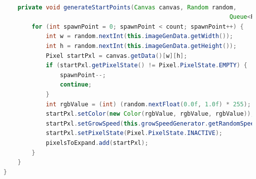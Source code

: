 \documentclass[a4paper,10pt,ngerman]{scrartcl}
\begin{document}
\begin{lstlisting}[language=Java]
    
    private void generateStartPoints(Canvas canvas, Random random, 
    															Queue<Pixel> pixelsToExpand, int count) {
        for (int spawnPoint = 0; spawnPoint < count; spawnPoint++) {
            int w = random.nextInt(this.imageGenData.getWidth());
            int h = random.nextInt(this.imageGenData.getHeight());
            Pixel startPxl = canvas.getData()[w][h];
            if (startPxl.getPixelState() != Pixel.PixelState.EMPTY) {
                spawnPoint--;
                continue;
            }
            int rgbValue = (int) (random.nextFloat(0.0f, 1.0f) * 255);
            startPxl.setColor(new Color(rgbValue, rgbValue, rgbValue));
            startPxl.setGrowSpeed(this.growSpeedGenerator.getRandomSpeed());
            startPxl.setPixelState(Pixel.PixelState.INACTIVE);
            pixelsToExpand.add(startPxl);
        }
    }
}
\end{lstlisting}

\newpage
\end{document}
